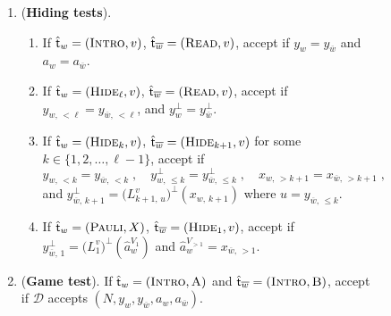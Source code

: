 \documentclass[11pt]{article}
\theoremstyle{definition}
\newcommand{\decider}{\mathcal{D}}
\newcommand{\labelstyle}[1]{\ensuremath{\textsc{#1}}\xspace}
\newcommand{\tvarstyle}[1]{\mathsf{#1}}
\newcommand{\tvar}{\ensuremath{\tvarstyle{t}}}
\newcommand{\trole}{\ensuremath{v}}
\newcommand{\alice}{\labelstyle{A}}
\newcommand{\bob}{\labelstyle{B}}
\newcommand{\typestyle}[1]{\ensuremath{\textsc{#1}}\xspace}
\newcommand{\Pauli}{\typestyle{Pauli}}
\newcommand{\Sample}{\typestyle{Sample}}
\newcommand{\Read}{\typestyle{Read}}
\newcommand{\Hide}[1]{\typestyle{Hide}_{#1}}
\newcommand{\Introspect}{\typestyle{Intro}}
\newenvironment{gamespec}{
  \begin{mdframed}[style=figstyle]}{
  \end{mdframed}}
\begin{document}
\begin{figure}[!htbp]
\begin{gamespec}
\begin{enumerate}[itemsep=2pt, parsep=2pt]
\begin{enumerate}
      \item If $\hat{\tvar}_w = (\Introspect, \trole)$,
        $\hat{\tvar}_{\overline{w}} = (\Sample, \trole)$, accept if $y_{w} =
        L^\trole(z_{\overline{w}})$ and $a_w=a_{\overline{w}}$.
        \label{enu:sampling-intro}
      \end{enumerate}

    \item (\textbf{Hiding tests}).
      \label{enu:hiding}
      \begin{enumerate}

      \item If $\hat{\tvar}_w = (\Introspect, \trole)$,
        $\hat{\tvar}_{\overline{w}} = (\Read, \trole)$, accept if $y_{w} =
        y_{\overline{w}}$ and $a_w = a_{\overline{w}}$.
        \label{enu:hiding-intro}

      \item If $\hat{\tvar}_w = (\Hide{\ell}, \trole)$,
        $\hat{\tvar}_{\overline{w}} = (\Read, \trole)$, accept if $y_{w,\,
          <\ell} = y_{\overline{w},\, <\ell}$, and $y^{\perp}_w =
        y^{\perp}_{\overline{w}}$.
        \label{enu:hiding-read}
        
      \item \label{enu:hiding-same} If $\hat{\tvar}_w = (\Hide{k}, \trole)$,
        $\hat{\tvar}_{\overline{w}} = (\Hide{k+1}, \trole)$ for some $k \in \{ 1,
        2, \ldots, \ell-1 \}$, accept if
        \begin{equation*}
          y_{w,\, <k} = y_{\overline{w},\, <k}\;, \quad
          y^{\perp}_{w,\, \le k} = y^{\perp}_{\overline{w},\, \le k}\;, \quad
          x_{w,\, >k+1} = x_{\overline{w},\, >k+1}\;,
        \end{equation*}
        and $y^{\perp}_{\overline{w},\, k+1} = \big( L^{\trole}_{k+1,\, u} \big)^\perp
        (x_{w,\, k+1})$ where $u = y_{\overline{w},\, \le k}$.
      \item If $\hat{\tvar}_w = (\Pauli,X)$, $\hat{\tvar}_{\overline{w}} =
        (\Hide{1}, \trole)$, accept if $y^\perp_{\overline{w},\, 1} =
        \bigl( L^{\trole}_1 \bigr)^\perp (\hat{a}_w^{V_1})$ and $\hat{a}_w^{V_{> 1}} =
        x_{\overline{w},\, >1}$.
        \label{enu:hiding-pauli}
      \end{enumerate}

    \item (\textbf{Game test}).
      \label{enu:intro-game}
      If $\hat{\tvar}_w = (\Introspect, \alice)$ and $\hat{\tvar}_{\overline{w}}
      = (\Introspect, \bob)$, accept if $\decider$ accepts $(N, y_w,
      y_{\overline{w}}, a_w, a_{\overline{w}})$.


\end{enumerate}
\end{gamespec}
\end{figure}
\end{document}
